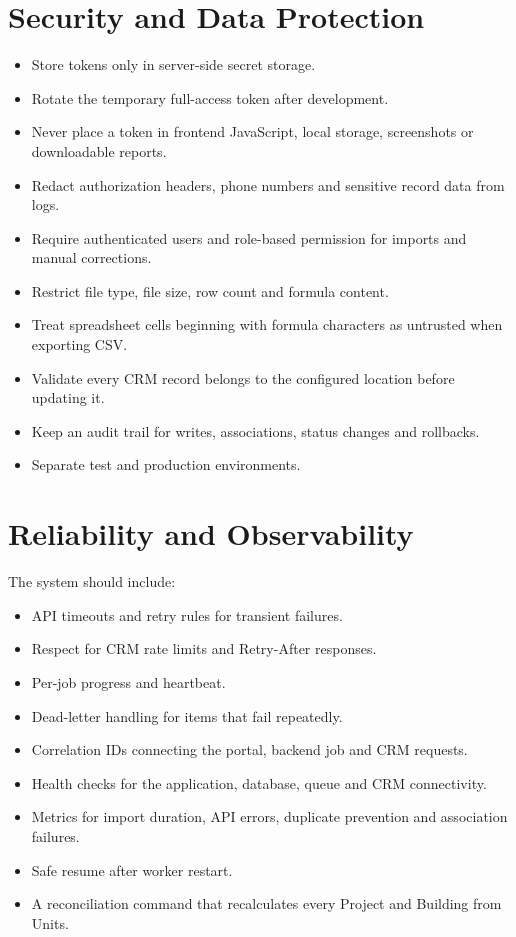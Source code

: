\documentclass[10pt]{article}
\begin{document}
\section{Security and Data Protection}
\begin{itemize}
\item Store tokens only in server-side secret storage.
\item Rotate the temporary full-access token after development.
\item Never place a token in frontend JavaScript, local storage, screenshots or downloadable reports.
\item Redact authorization headers, phone numbers and sensitive record data from logs.
\item Require authenticated users and role-based permission for imports and manual corrections.
\item Restrict file type, file size, row count and formula content.
\item Treat spreadsheet cells beginning with formula characters as untrusted when exporting CSV.
\item Validate every CRM record belongs to the configured location before updating it.
\item Keep an audit trail for writes, associations, status changes and rollbacks.
\item Separate test and production environments.
\end{itemize}

\section{Reliability and Observability}
The system should include:
\begin{itemize}
\item API timeouts and retry rules for transient failures.
\item Respect for CRM rate limits and Retry-After responses.
\item Per-job progress and heartbeat.
\item Dead-letter handling for items that fail repeatedly.
\item Correlation IDs connecting the portal, backend job and CRM requests.
\item Health checks for the application, database, queue and CRM connectivity.
\item Metrics for import duration, API errors, duplicate prevention and association failures.
\item Safe resume after worker restart.
\item A reconciliation command that recalculates every Project and Building from Units.
\end{itemize}
\end{document}
